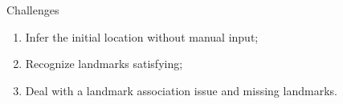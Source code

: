 \begin{frame}{Challenges}
    \begin{enumerate}[<+->]
        \item Infer the initial location without manual input;
        \item Recognize landmarks satisfying;
        \item Deal with a landmark association issue and missing landmarks.
    \end{enumerate}
\end{frame}
